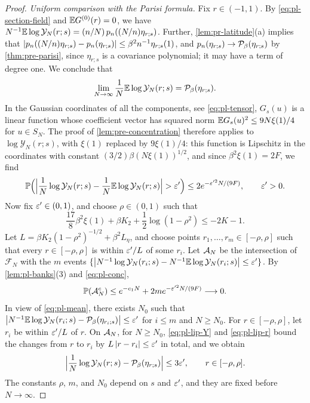 \begin{proof}
\emph{Uniform comparison with the Parisi formula.} Fix $r\in(-1,1)$. By \eqref{eq:pl-section-field} and $\mathbb E G^{(0)}(r)=0$, we have $N^{-1}\mathbb E\log\mathcal Y_N(r;s)=(n/N)\,p_n((N/n)\eta_{r;s})$. Further, \cref{lem:pr-latitude}(a) implies that $\left|p_n((N/n)\eta_{r;s})-p_n(\eta_{r;s})\right|\le\beta^2n^{-1}\eta_{r;s}(1)$, and $p_n(\eta_{r;s})\to\mathcal P_\beta(\eta_{r;s})$ by \cref{thm:pre-parisi}, since $\eta_{r;s}$ is a covariance polynomial; it may have a term of degree one. We conclude that
\begin{equation}\label{eq:pl-mean}
\lim_{N\to\infty}\frac1N\mathbb E\log\mathcal Y_N(r;s)=\mathcal P_\beta(\eta_{r;s}).
\end{equation}
In the Gaussian coordinates of all the components, see \eqref{eq:pl-tensor}, $G_s(u)$ is a linear function whose coefficient vector has squared norm $\mathbb E G_s(u)^2\le9N\xi(1)/4$ for $u\in S_N$. The proof of \cref{lem:pre-concentration} therefore applies to $\log\mathcal Y_N(r;s)$, with $\xi(1)$ replaced by $9\xi(1)/4$: this function is Lipschitz in the coordinates with constant $(3/2)\beta(N\xi(1))^{1/2}$, and since $\beta^2\xi(1)=2F$, we find
\begin{equation}\label{eq:pl-conc}
\Pp\Bigl(\Bigl|\frac1N\log\mathcal Y_N(r;s)-\frac1N\E\log\mathcal Y_N(r;s)\Bigr|>\eps'\Bigr)\le2e^{-\eps'^2N/(9F)},\qquad\eps'>0.
\end{equation}
Now fix $\varepsilon'\in(0,1)$, and choose $\rho\in(0,1)$ such that
\begin{equation}\label{eq:pl-rho}
\frac{17}8\beta^2\xi(1)+\beta K_2+\frac12\log(1-\rho^2)\le-2K-1 .
\end{equation}
Let $L=\beta K_2(1-\rho^2)^{-1/2}+\beta^2L_\eta$, and choose points $r_1,\dots,r_m\in[-\rho,\rho]$ such that every $r\in[-\rho,\rho]$ is within $\varepsilon'/L$ of some $r_i$. Let $\mathcal A_N$ be the intersection of $\mathcal F_N$ with the $m$ events $\{\left|N^{-1}\log\mathcal Y_N(r_i;s)-N^{-1}\mathbb E\log\mathcal Y_N(r_i;s)\right|\le\varepsilon'\}$. By \cref{lem:pl-banks}(3) and \eqref{eq:pl-conc},
\begin{equation}\label{eq:pl-AN}
\mathbb P(\mathcal A_N^c)\le e^{-c_1N}+2me^{-\varepsilon'^2N/(9F)}\longrightarrow0 .
\end{equation}
In view of \eqref{eq:pl-mean}, there exists $N_0$ such that $\left|N^{-1}\mathbb E\log\mathcal Y_N(r_i;s)-\mathcal P_\beta(\eta_{r_i;s})\right|\le\varepsilon'$ for $i\le m$ and $N\ge N_0$. For $r\in[-\rho,\rho]$, let $r_i$ be within $\varepsilon'/L$ of $r$. On $\mathcal A_N$, for $N\ge N_0$, \eqref{eq:pl-lip-Y} and \eqref{eq:pl-lip-r} bound the changes from $r$ to $r_i$ by $L\left|r-r_i\right|\le\varepsilon'$ in total, and we obtain
\begin{equation}\label{eq:pl-unif}
\Bigl|\frac1N\log\mathcal Y_N(r;s)-\mathcal P_\beta(\eta_{r;s})\Bigr|\le3\varepsilon',\qquad r\in[-\rho,\rho].
\end{equation}
The constants $\rho$, $m$, and $N_0$ depend on $s$ and $\varepsilon'$, and they are fixed before $N\to\infty$.


\end{proof}
